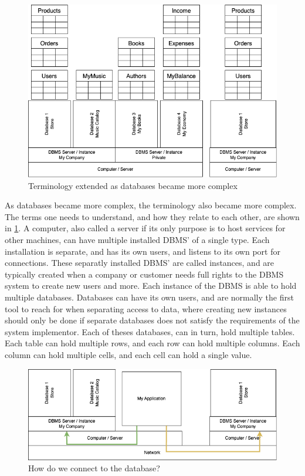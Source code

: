 \begin{figure}[htbp]
    \centering
    \includegraphics[width=1\textwidth]{content/1-relational-databases/figures/1.DatabaseAndTerminologyMap.drawio.png}
    \caption{Terminology extended as databases became more complex}
    \label{fig:1.dbms-content-anatomy.png}
\end{figure}

As databases became more complex, the terminology also became more complex. The terms one needs to understand, and how they relate to each other, are shown in \cref{fig:1.dbms-content-anatomy.png}. A computer, also called a server if its only purpose is to host services for other machines, can have multiple installed DBMS' of a single type. Each installation is separate, and has its own users, and listens to its own port for connections. These separatly installed DBMS' are called instances, and are typically created when a company or customer needs full rights to the DBMS system to create new users and more. Each instance of the DBMS is able to hold multiple databases. Databases can have its own users, and are normally the first tool to reach for when separating access to data, where creating new instances should only be done if separate databases does not satisfy the requirements of the system implementor. Each of theses databases, can in turn, hold multiple tables. Each table can hold multiple rows, and each row can hold multiple columns. Each column can hold multiple cells, and each cell can hold a single value.

\begin{figure}[htbp]
    \centering
    \includegraphics[width=1\textwidth]{content/1-relational-databases/figures/1.DatabasesAndConnecting.drawio.png}
    \caption{How do we connect to the database?}
    \label{fig:1.dbms-connection-explained.png}
\end{figure}

